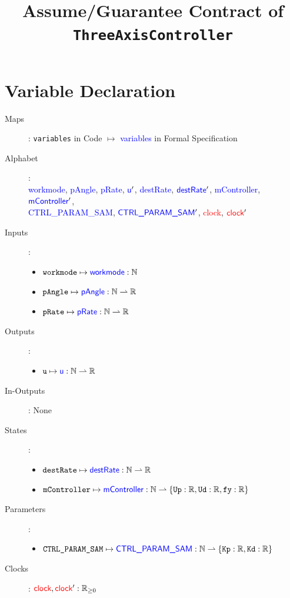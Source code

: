 \documentclass[fleqn,a4paper]{article}
\newcommand\var[1]{\texttt{#1}}
\newcommand\Var[1]{\textcolor{blue}{\textsf{#1}}}
\newcommand\clock{\textcolor{red}{\textsf{clock}}}
\begin{document}
\title{Assume/Guarantee Contract of \texttt{ThreeAxisController}}
\author{}

\maketitle

\section{Variable Declaration}

\begin{description}
\item[Maps]:
\var{variables} in Code $\mapsto$ \Var{variables} in Formal Specification

\item[Alphabet]: \\
\Var{workmode},
\Var{pAngle},
\Var{pRate},
$\Var{u}'$,
\Var{destRate},
$\Var{destRate}'$,
\Var{mController},
$\Var{mController}'$, \\
\Var{CTRL\_PARAM\_SAM},
$\Var{CTRL\_PARAM\_SAM}'$,
\clock,
$\clock'$

\item[Inputs]:
\begin{itemize}
\item $\var{workmode} \mapsto \Var{workmode} : \mathbb{N}$
\item $\var{pAngle} \mapsto \Var{pAngle} : \mathbb{N} \rightharpoonup \mathbb{R}$
\item $\var{pRate} \mapsto \Var{pRate} : \mathbb{N} \rightharpoonup \mathbb{R}$
\end{itemize}

\item[Outputs]:
\begin{itemize}
\item $\var{u} \mapsto \Var{u} : \mathbb{N} \rightharpoonup \mathbb{R}$
\end{itemize}

\item[In-Outputs]: None

\item[States]:
\begin{itemize}
\item $\var{destRate} \mapsto \Var{destRate} : \mathbb{N} \rightharpoonup \mathbb{R}$
\item $\var{mController} \mapsto \Var{mController}:\mathbb{N} \rightharpoonup \{\texttt{Up} : \mathbb{R}, \texttt{Ud} : \mathbb{R}, \texttt{fy} : \mathbb{R}\}$
\end{itemize}

\item[Parameters]:
\begin{itemize}
\item $\var{CTRL\_PARAM\_SAM}\mapsto\Var{CTRL\_PARAM\_SAM} : \mathbb{N} \rightharpoonup \{\texttt{Kp} : \mathbb{R}, \texttt{Kd} : \mathbb{R}\}$
\end{itemize}

\item[Clocks]:
$\clock, \clock' : \mathbb{R}_{\geq 0}$

\end{description}
\end{document}
